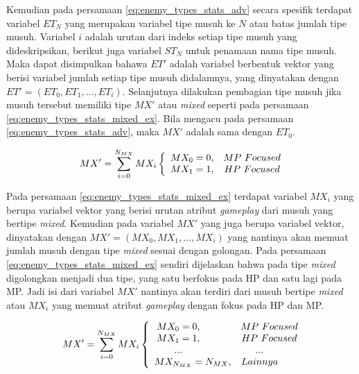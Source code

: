 Kemudian pada persamaan \ref{eq:enemy_types_stats_adv} secara spesifik terdapat variabel $ET_{N}$ yang merupakan variabel tipe musuh ke $N$ atau batas jumlah tipe musuh. Variabel $i$ adalah urutan dari indeks setiap tipe musuh yang dideskripsikan, berikut juga variabel $ST_{N}$ untuk penamaan nama tipe musuh. Maka dapat disimpulkan bahawa $ET'$ adalah variabel berbentuk vektor yang berisi variabel jumlah setiap tipe musuh didalamnya, yang dinyatakan dengan $ET' = \left ( ET_{0}, ET_{1}, ..., ET_{i} \right )$. Selanjutnya dilakukan pembagian tipe musuh jika musuh tersebut memiliki tipe $MX'$ atau \textit{mixed} seperti pada persamaan \ref{eq:enemy_types_stats_mixed_ex}. Bila mengacu pada persamaan \ref{eq:enemy_types_stats_adv}, maka $MX'$ adalah sama dengan $ET_{0}$.
\vspace{1ex}

\begin{equation}\label{eq:enemy_types_stats_mixed_ex}
MX' = \sum_{i= 0}^{N_{MX}} MX_{i} \left\{\begin{matrix}
\hspace{0.5em} MX_{0} = 0, & MP\ Focused\\
\hspace{0.5em} MX_{1} = 1, & HP\ Focused
\end{matrix}\right.
\end{equation}

Pada persamaan \ref{eq:enemy_types_stats_mixed_ex} terdapat variabel $MX_{i}$ yang berupa variabel vektor yang berisi urutan atribut \textit{gameplay} dari musuh yang bertipe \textit{mixed}. Kemudian pada variabel $MX'$ yang juga berupa variabel vektor, dinyatakan dengan $MX' = \left (MX_{0}, MX_{1}, ..., MX_{i} \right )$ yang nantinya akan memuat jumlah musuh dengan tipe \textit{mixed} sesuai dengan golongan. Pada persamaan \ref{eq:enemy_types_stats_mixed_ex} sendiri dijelaskan bahwa pada tipe \textit{mixed} digolongkan menjadi dua tipe, yang satu berfokus pada HP dan satu lagi pada MP. Jadi isi dari variabel $MX'$ nantinya akan terdiri dari musuh bertipe \textit{mixed} atau $MX_{i}$ yang memuat atribut \textit{gameplay} dengan fokus pada HP dan MP.
\vspace{1ex}

\begin{equation}\label{eq:enemy_types_stats_mixed_adv}
MX' = \sum_{i= 0}^{N_{MX}} MX_{i} \left\{\begin{matrix}
\hspace{-2.5em} MX_{0} = 0, & MP\ Focused\\
\hspace{-2.5em} MX_{1} = 1, & HP\ Focused\\
\hspace{-2.5em} ... & \hspace{-2.0em} ...\\
\hspace{0.5em} MX_{N_{MX}} = N_{MX}, & \hspace{-2.0em} Lainnya\\
\end{matrix}\right.
\end{equation}


